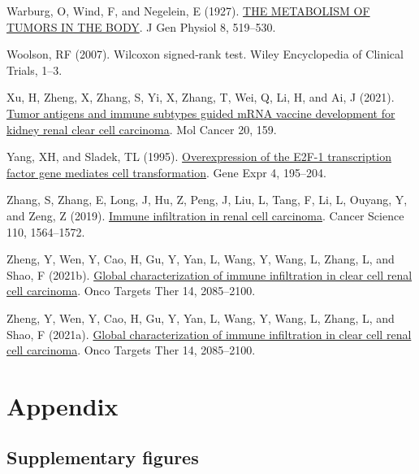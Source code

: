 \documentclass[
  parskip,
  oneside]{scrreprt}
\newlength{\cslhangindent}
\newlength{\cslentryspacingunit} %
\newenvironment{CSLReferences}[2] %
 {%
  \setlength{\parindent}{0pt}
  \ifodd #1
  \let\oldpar\par
  \def\par{\hangindent=\cslhangindent\oldpar}
  \fi
  \setlength{\parskip}{#2\cslentryspacingunit}
 }%
 {}
\begin{document}
\begin{CSLReferences}{0}{0}
\leavevmode{}%
Warburg, O, Wind, F, and Negelein, E (1927).
\href{https://doi.org/10.1085/jgp.8.6.519}{THE METABOLISM OF TUMORS IN
THE BODY}. J Gen Physiol 8, 519--530.

\leavevmode{}%
Woolson, RF (2007). Wilcoxon signed‐rank test. Wiley Encyclopedia of
Clinical Trials, 1--3.

\leavevmode{}%
Xu, H, Zheng, X, Zhang, S, Yi, X, Zhang, T, Wei, Q, Li, H, and Ai, J
(2021). \href{https://doi.org/10.1186/s12943-021-01465-w}{Tumor antigens
and immune subtypes guided mRNA vaccine development for kidney renal
clear cell carcinoma}. Mol Cancer 20, 159.

\leavevmode{}%
Yang, XH, and Sladek, TL (1995).
\href{https://www.ncbi.nlm.nih.gov/pubmed/7787412}{Overexpression of the
E2F-1 transcription factor gene mediates cell transformation}. Gene Expr
4, 195--204.

\leavevmode{}%
Zhang, S, Zhang, E, Long, J, Hu, Z, Peng, J, Liu, L, Tang, F, Li, L,
Ouyang, Y, and Zeng, Z (2019).
\href{https://doi.org/10.1111/cas.13996}{Immune infiltration in renal
cell carcinoma}. Cancer Science 110, 1564--1572.

\leavevmode{}%
Zheng, Y, Wen, Y, Cao, H, Gu, Y, Yan, L, Wang, Y, Wang, L, Zhang, L, and
Shao, F (2021b). \href{https://doi.org/10.2147/ott.S282763}{Global
characterization of immune infiltration in clear cell renal cell
carcinoma}. Onco Targets Ther 14, 2085--2100.

\leavevmode{}%
Zheng, Y, Wen, Y, Cao, H, Gu, Y, Yan, L, Wang, Y, Wang, L, Zhang, L, and
Shao, F (2021a). \href{https://doi.org/10.2147/ott.S282763}{Global
characterization of immune infiltration in clear cell renal cell
carcinoma}. Onco Targets Ther 14, 2085--2100.

\end{CSLReferences}

\hypertarget{appendix}{%
\chapter{Appendix}\label{appendix}}

\hypertarget{supplementary-figures}{%
\section{Supplementary figures}\label{supplementary-figures}}
\end{document}

